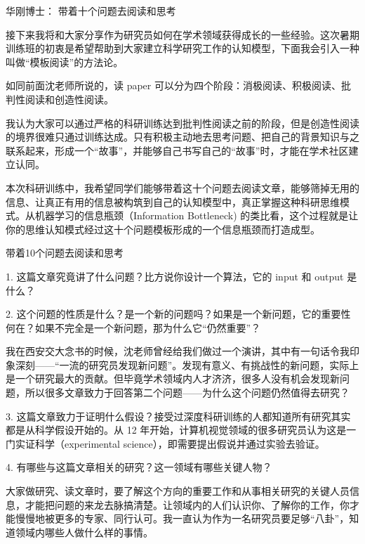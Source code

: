 华刚博士：
带着十个问题去阅读和思考



接下来我将和大家分享作为研究员如何在学术领域获得成长的一些经验。这次暑期训练班的初衷是希望帮助到大家建立科学研究工作的认知模型，下面我会引入一种叫做“模板阅读”的方法论。



如同前面沈老师所说的，读 paper 可以分为四个阶段：消极阅读、积极阅读、批判性阅读和创造性阅读。



我认为大家可以通过严格的科研训练达到批判性阅读之前的阶段，但是创造性阅读的境界很难只通过训练达成。只有积极主动地去思考问题、把自己的背景知识与之联系起来，形成一个“故事”，并能够自己书写自己的“故事”时，才能在学术社区建立认同。



本次科研训练中，我希望同学们能够带着这十个问题去阅读文章，能够筛掉无用的信息、让真正有用的信息被构筑到自己的认知模型中，真正掌握这种科研思维模式。从机器学习的信息瓶颈（Information Bottleneck) 的类比看，这个过程就是让你的思维认知模式经过这十个问题模板形成的一个信息瓶颈而打造成型。



带着10个问题去阅读和思考


1. 这篇文章究竟讲了什么问题？比方说你设计一个算法，它的 input 和 output 是什么？



2. 这个问题的性质是什么？是一个新的问题吗？如果是一个新问题，它的重要性何在？如果不完全是一个新问题，那为什么它“仍然重要”？



我在西安交大念书的时候，沈老师曾经给我们做过一个演讲，其中有一句话令我印象深刻——“一流的研究员发现新问题”。发现有意义、有挑战性的新问题，实际上是一个研究最大的贡献。但毕竟学术领域内人才济济，很多人没有机会发现新问题，所以很多文章致力于回答第二个问题——为什么这个问题仍然值得去研究？


3. 这篇文章致力于证明什么假设？接受过深度科研训练的人都知道所有研究其实都是从科学假设开始的。从 12 年开始，计算机视觉领域的很多研究员认为这是一门实证科学（experimental science），即需要提出假说并通过实验去验证。



4. 有哪些与这篇文章相关的研究？这一领域有哪些关键人物？



大家做研究、读文章时，要了解这个方向的重要工作和从事相关研究的关键人员信息，才能把问题的来龙去脉搞清楚。让领域内的人们认识你、了解你的工作，你才能慢慢地被更多的专家、同行认可。我一直认为作为一名研究员要足够“八卦”，知道领域内哪些人做什么样的事情。



